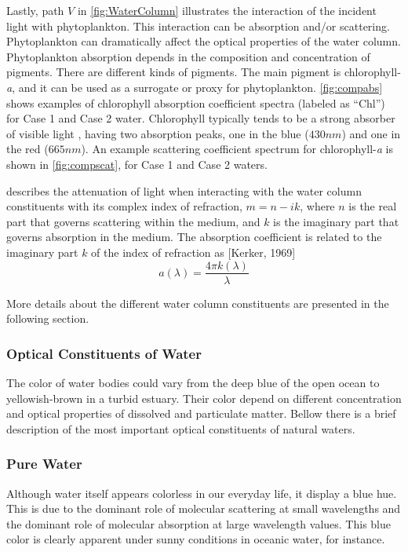 Lastly, path $V$ in \autoref{fig:WaterColumn} illustrates the interaction of the incident light with phytoplankton. This interaction can be absorption and/or scattering. Phytoplankton can dramatically affect the optical properties of the water column. Phytoplankton absorption depends in the composition and concentration of pigments. There are different kinds of pigments. The main pigment is chlorophyll-{\it a}, and it can be used as a surrogate or proxy for phytoplankton. \autoref{fig:compabs} shows examples of chlorophyll absorption coefficient spectra (labeled as ``Chl'') for Case 1 and Case 2 water. Chlorophyll typically tends to be a strong absorber of visible light \cite{Mobley1994}, having two absorption peaks, one in the blue ($430nm$) and one in the red ($665nm$). An example scattering coefficient spectrum for chlorophyll-{\it a} is shown in \autoref{fig:compscat}, for Case 1 and Case 2 waters.

\cite{Mobley1994} describes the attenuation of light when interacting with the water column constituents with its complex index of refraction, $m=n-ik$, where $n$ is the real part that governs scattering within the medium, and $k$ is the imaginary part that governs absorption in the medium. The absorption coefficient is related to the imaginary part $k$ of the index of refraction as [Kerker, 1969]
\begin{equation}
  a(\lambda)=\frac{4\pi k(\lambda)}{\lambda}
\end{equation}

More details about the different water column constituents are presented in the following section.

\subsubsection{Optical Constituents of Water}
The color of water bodies could vary from the deep blue of the open ocean to yellowish-brown in a turbid estuary. Their color depend on different concentration and optical properties of dissolved and particulate matter. Bellow there is a brief description of the most important optical constituents of natural waters.
\subsubsection*{Pure Water}
Although water itself appears colorless in our everyday life, it display a blue hue. This is due to the dominant role of molecular scattering at small wavelengths and the dominant role of molecular absorption at large wavelength values. This blue color is clearly apparent under sunny conditions in oceanic water, for instance.
